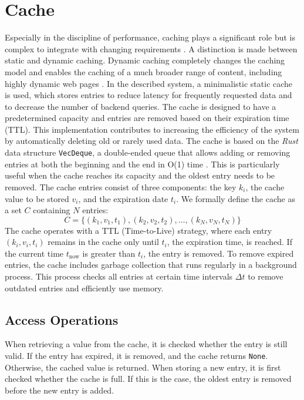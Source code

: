 \documentclass[twocolumn]{webofc}
\begin{document}
\section{Cache}
Especially in the discipline of performance, caching plays a significant role but is complex to integrate with changing requirements \cite{hennessy2011computer}. A distinction is made between static and dynamic caching. Dynamic caching completely changes the caching model and enables the caching of a much broader range of content, including highly dynamic web pages \cite{cloudflare2024caching}. In the described system, a minimalistic static cache is used, which stores entries to reduce latency for frequently requested data and to decrease the number of backend queries. The cache is designed to have a predetermined capacity and entries are removed based on their expiration time (TTL). This implementation contributes to increasing the efficiency of the system by automatically deleting old or rarely used data. The cache is based on the \textit{Rust} data structure \texttt{VecDeque}, a double-ended queue that allows adding or removing entries at both the beginning and the end in O(1) time \cite{rust_vecdeque}. This is particularly useful when the cache reaches its capacity and the oldest entry needs to be removed. The cache entries consist of three components: the key \( k_i \), the cache value to be stored \( v_i \), and the expiration date \( t_i \). We formally define the cache as a set \( C \) containing \( N \) entries:
\[
    C = \{ (k_1, v_1, t_1), (k_2, v_2, t_2), \dots, (k_N, v_N, t_N) \}
\]
The cache operates with a TTL (Time-to-Live) strategy, where each entry \( (k_i, v_i, t_i) \) remains in the cache only until \( t_i \), the expiration time, is reached. If the current time \( t_{\text{now}} \) is greater than \( t_i \), the entry is removed. To remove expired entries, the cache includes garbage collection that runs regularly in a background process. This process checks all entries at certain time intervals \( \Delta t \) to remove outdated entries and efficiently use memory.

\subsection{Access Operations}
When retrieving a value from the cache, it is checked whether the entry is still valid. If the entry has expired, it is removed, and the cache returns \texttt{None}. Otherwise, the cached value is returned. When storing a new entry, it is first checked whether the cache is full. If this is the case, the oldest entry is removed before the new entry is added.
\end{document}
